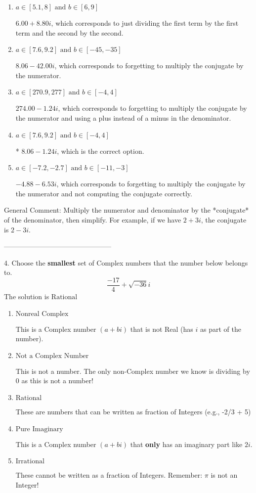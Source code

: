 \documentclass{article}[14pt]
\begin{document}
\begin{enumerate}[label=\Alph*.] 
\item $ a \in [5.1, 8] \text{ and } b \in [6, 9] $ 

  $6.00  + 8.80 i$, which corresponds to just dividing the first term by the first term and the second by the second. 
\item $ a \in [7.6, 9.2] \text{ and } b \in [-45, -35] $ 

  $8.06  - 42.00 i$, which corresponds to forgetting to multiply the conjugate by the numerator. 
\item $ a \in [270.9, 277] \text{ and } b \in [-4, 4] $ 

  $274.00  - 1.24 i$, which corresponds to forgetting to multiply the conjugate by the numerator and using a plus instead of a minus in the denominator. 
\item $ a \in [7.6, 9.2] \text{ and } b \in [-4, 4] $ 

 * $8.06  - 1.24 i$, which is the correct option. 
\item $ a \in [-7.2, -2.7] \text{ and } b \in [-11, -3] $ 

  $-4.88  - 6.53 i$, which corresponds to forgetting to multiply the conjugate by the numerator and not computing the conjugate correctly. 
\end{enumerate} 
 
General Comment: Multiply the numerator and denominator by the *conjugate* of the denominator, then simplify. For example, if we have $2+3i$, the conjugate is $2-3i$.

-----------------------------------------------

4. Choose the \textbf{smallest} set of Complex numbers that the number below belongs to.
$$ \frac{-17}{4}+\sqrt{-36}i $$ 
The solution is $ \text{Rational} $ 

\begin{enumerate}[label=\Alph*.] 
\item $ \text{Nonreal Complex} $ 

 This is a Complex number $(a+bi)$ that is not Real (has $i$ as part of the number). 
\item $ \text{Not a Complex Number} $ 

 This is not a number. The only non-Complex number we know is dividing by 0 as this is not a number! 
\item $ \text{Rational} $ 

 These are numbers that can be written as fraction of Integers (e.g., -2/3 + 5) 
\item $ \text{Pure Imaginary} $ 

 This is a Complex number $(a+bi)$ that \textbf{only} has an imaginary part like $2i$. 
\item $ \text{Irrational} $ 

 These cannot be written as a fraction of Integers. Remember: $\pi$ is not an Integer! 
\end{enumerate} 
 
\end{document}
